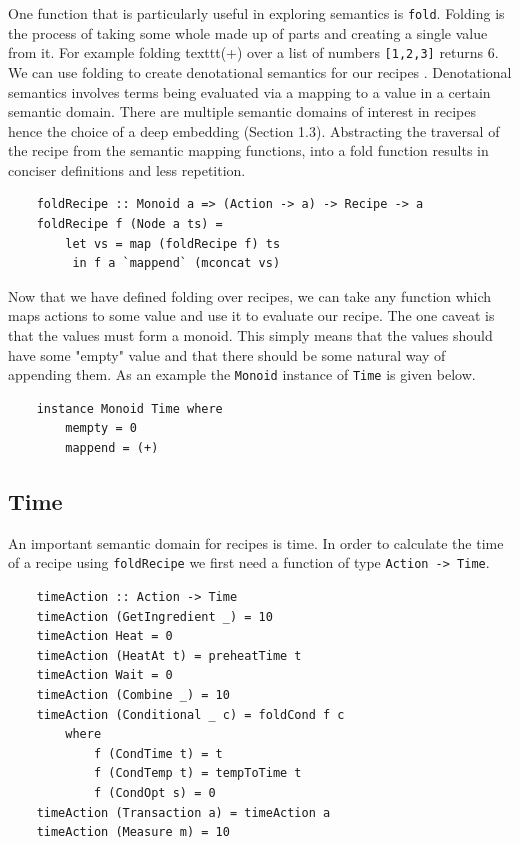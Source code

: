 \documentclass[11pt]{article}
\begin{document}
One function that is particularly useful in exploring semantics is \texttt{fold}.
Folding is the process of taking some whole made up of parts and creating a single
value from it. For example folding texttt{(+)} over a list of numbers \texttt{[1,2,3]}
returns 6. We can use folding to create denotational semantics for our recipes \cite{hutton}.
Denotational semantics involves terms being evaluated via a mapping to a value in a certain
semantic domain. There are multiple semantic domains of interest in recipes hence the choice
of a deep embedding (Section 1.3). Abstracting the traversal of the recipe from the
semantic mapping functions, into a fold function results in conciser definitions and
less repetition.

\begin{lstlisting}
    foldRecipe :: Monoid a => (Action -> a) -> Recipe -> a
    foldRecipe f (Node a ts) =
        let vs = map (foldRecipe f) ts
         in f a `mappend` (mconcat vs)
\end{lstlisting}

Now that we have defined folding over recipes, we can take any function which maps actions
to some value and use it to evaluate our recipe. The one caveat is that the values must form
a monoid. This simply means that the values should have some "empty" value and that there should
be some natural way of appending them. As an example the \texttt{Monoid} instance of
\texttt{Time} is given below.

\begin{lstlisting}
    instance Monoid Time where
        mempty = 0
        mappend = (+)
\end{lstlisting}

\subsection{Time}

An important semantic domain for recipes is time. In order to calculate the
time of a recipe using \texttt{foldRecipe} we first need a function of type \texttt{Action -> Time}.

\begin{lstlisting}
    timeAction :: Action -> Time
    timeAction (GetIngredient _) = 10
    timeAction Heat = 0
    timeAction (HeatAt t) = preheatTime t
    timeAction Wait = 0
    timeAction (Combine _) = 10
    timeAction (Conditional _ c) = foldCond f c
        where
            f (CondTime t) = t
            f (CondTemp t) = tempToTime t
            f (CondOpt s) = 0
    timeAction (Transaction a) = timeAction a
    timeAction (Measure m) = 10
\end{lstlisting}
\end{document}
